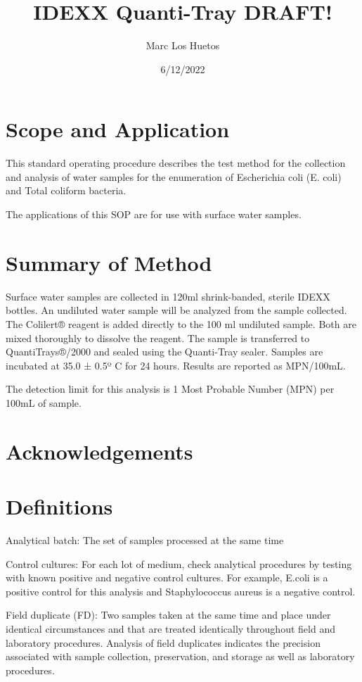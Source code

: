 \documentclass[12pt]{../SOP4_alpha}\usepackage[]{graphicx}\usepackage[]{xcolor}
\title{IDEXX Quanti-Tray DRAFT!}
\date{6/12/2022}
\author{Marc Los Huetos}
\begin{document}
\maketitle
\section{Scope and Application}

\NP This standard operating procedure describes the test method for the collection and analysis of water samples for the enumeration of Escherichia coli (E. coli) and
Total coliform bacteria.

\NP The applications of this SOP are for use with surface water samples.  

\section{Summary of Method}

\NP Surface water samples are collected in 120ml shrink-banded, sterile IDEXX bottles. An undiluted water sample will be analyzed from the sample collected.
The Colilert® reagent is added directly to the 100 ml undiluted sample. Both are mixed thoroughly to dissolve the reagent. The sample is transferred to QuantiTrays®/2000 and sealed using the Quanti-Tray sealer. Samples are incubated at 35.0 ± 0.5º C for 24 hours. Results are reported as MPN/100mL. 

\NP The detection limit for this analysis is 1 Most Probable Number (MPN) per 100mL of sample. 

\tableofcontents

\newpage

\section{Acknowledgements}

\section{Definitions}

\NP Analytical batch: The set of samples processed at the same time

\NP Control cultures: For each lot of medium, check analytical procedures by
testing with known positive and negative control cultures. For example,
E.coli is a positive control for this analysis and Staphylococcus aureus is a
negative control.

\NP Field duplicate (FD): Two samples taken at the same time and place under
identical circumstances and that are treated identically throughout field
and laboratory procedures. Analysis of field duplicates indicates the
precision associated with sample collection, preservation, and storage as
well as laboratory procedures.
\end{document}
